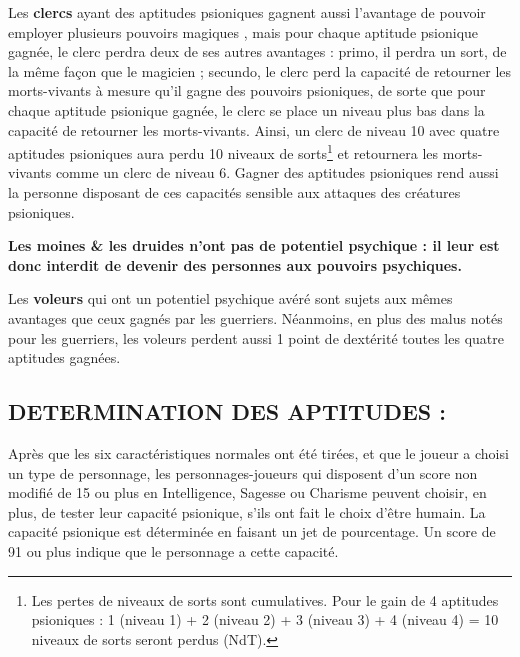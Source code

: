 {\bigskip

Les \textbf{clercs} ayant des aptitudes psioniques gagnent aussi l'avantage de pouvoir employer plusieurs pouvoirs \og magiques \fg{}, mais pour chaque aptitude psionique gagnée, le clerc perdra deux de ses autres avantages : primo, il perdra un sort, de la même façon que le magicien ; secundo, le clerc perd la capacité de retourner les morts-vivants à mesure qu'il gagne des pouvoirs  psioniques, de sorte que pour chaque aptitude psionique gagnée, le clerc se place un niveau plus bas dans la capacité de retourner les morts-vivants. Ainsi, un clerc de niveau 10 avec quatre aptitudes psioniques aura perdu 10 niveaux de sorts\footnote{Les pertes de niveaux de sorts sont cumulatives. Pour le gain de 4 aptitudes psioniques : 1 (niveau 1) + 2 (niveau 2) + 3 (niveau 3) + 4 (niveau 4) = 10 niveaux de sorts seront perdus (NdT).} et retournera les morts-vivants comme un clerc de niveau 6. Gagner des aptitudes psioniques rend aussi la personne disposant de ces capacités sensible aux attaques des créatures psioniques.

\bigskip

\textbf{Les moines \& les druides n'ont pas de potentiel psychique : il leur est donc interdit de devenir des personnes aux pouvoirs psychiques.}

\bigskip

Les \textbf{voleurs} qui ont un potentiel psychique avéré sont sujets aux mêmes avantages que ceux gagnés par les guerriers. Néanmoins, en plus des malus notés pour les guerriers, les voleurs perdent aussi 1 point de dextérité toutes les quatre aptitudes gagnées.

\subsection*{\normalsize DETERMINATION DES APTITUDES :}

\medskip

Après que les six caractéristiques normales ont été tirées, et que le joueur a choisi un type de personnage, les personnages-joueurs qui disposent d'un score non modifié de 15 ou plus en Intelligence, Sagesse ou Charisme peuvent choisir, en plus, de tester leur capacité psionique, s'ils ont fait le choix d'être humain. La capacité psionique est déterminée en faisant un jet de pourcentage. Un score de 91 ou plus indique que le personnage a cette capacité.

}
